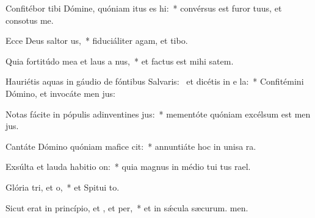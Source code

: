 \item Confitébor tibi Dómine, quóniam itus es hi:~* convérsus est furor tuus, et consotus  me.
\item Ecce Deus saltor us,~* fiduciáliter agam, et  tibo.
\item Quia fortitúdo mea et laus a nus,~* et factus est mihi  satem.
\item Hauriétis aquas in gáudio de fóntibus Salvaris:~\pscross{} et dicétis in e la:~* Confitémini Dómino, et invocáte men jus:
\item Notas fácite in pópulis adinventines jus:~* mementóte quóniam excélsum est men jus.
\item Cantáte Dómino quóniam mafice cit:~* annuntiáte hoc in unisa ra.
\item Exsúlta et lauda habitio on:~* quia magnus in médio tui tus rael.
\item Glória tri, et o,~* et Spitui to.
\item Sicut erat in princípio, et , et per,~* et in sǽcula sæcurum. men.

